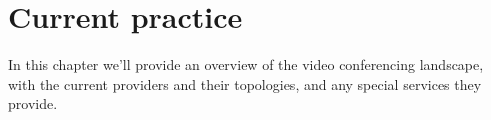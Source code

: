 \chapter{Current practice}\label{chp:current-practice}

In this chapter we'll provide an overview of the video conferencing landscape, with the current providers and their topologies, and any special services they provide.

